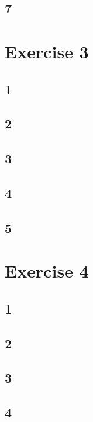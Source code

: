 \documentclass{article}
\begin{document}
    \subsection*{7}
    
  \section*{Exercise 3}
    \subsection*{1}
    
    \subsection*{2}
    
    \subsection*{3}
    
    \subsection*{4}
    
    \subsection*{5}
    
  \section*{Exercise 4}
    \subsection*{1}
    
    \subsection*{2}
    
    \subsection*{3}
    
    \subsection*{4}
\end{document}
